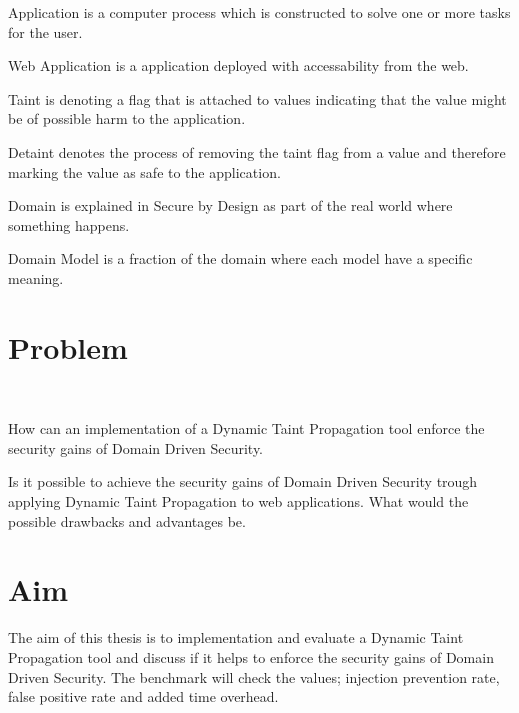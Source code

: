 \begin{definition}{Application} 
	is a computer process which is constructed to solve one or more tasks for the user.
\end{definition}

\begin{definition}{Web Application} 
	is a application deployed with accessability from the web.
\end{definition}

\begin{definition}{Taint}
	is denoting a flag that is attached to values indicating that the value might be of possible harm to the application.
\end{definition}

\begin{definition}{Detaint}
	denotes the process of removing the taint flag from a value and therefore marking the value as safe to the application.
\end{definition}

\begin{definition}{Domain}
	is explained in Secure by Design \parencite{sbd2018} as part of the real world where something happens.
\end{definition}

\begin{definition}{Domain Model}
	is a fraction of the domain where each model have a specific meaning.
\end{definition}


\section{Problem}
\hfill \\
\begin{chapquote}{}
	How can an implementation of a Dynamic Taint Propagation tool enforce the security gains of Domain Driven Security.
\end{chapquote}

\noindent
Is it possible to achieve the security gains of Domain Driven Security trough applying Dynamic Taint Propagation to web applications. What would the possible drawbacks and advantages be.


\section{Aim}
The aim of this thesis is to implementation and evaluate a Dynamic Taint Propagation tool and discuss if it helps to enforce the security gains of Domain Driven Security. The benchmark will check the values; injection prevention rate, false positive rate and added time overhead. 


